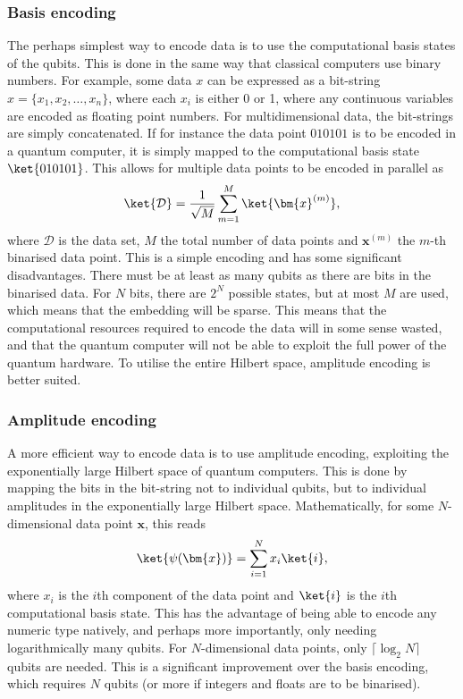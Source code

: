 \subsubsection{Basis encoding}
The perhaps simplest way to encode data is to use the computational basis states of the qubits.
This is done in the same way that classical computers use binary numbers.
For example, some data $x$ can be expressed as a bit-string $x = \{x_1, x_2, \dots, x_n\}$, where each $x_i$ is either 0 or 1, where any continuous variables are encoded as floating point numbers.
For multidimensional data, the bit-strings are simply concatenated.
% 
If for instance the data point $010101$ is to be encoded in a quantum computer, it is simply mapped to the computational basis state $\ket{010101}$.
This allows for multiple data points to be encoded in parallel as
\begin{equation}
  \ket{\mathcal{D}} = \frac{1}{\sqrt M} \sum_{m=1}^M \ket{\bm{x}^{(m)}},
\end{equation}
where $\mathcal{D}$ is the data set, $M$ the total number of data points and $\bm{x}^{(m)}$ the $m$-th binarised data point.
This is a simple encoding and has some significant disadvantages.
There must be at least as many qubits as there are bits in the binarised data.
For $N$ bits, there are $2^N$ possible states, but at most $M$ are used, which means that the embedding will be sparse.
This means that the computational resources required to encode the data will in some sense wasted, and that the quantum computer will not be able to exploit the full power of the quantum hardware.
To utilise the entire Hilbert space, amplitude encoding is better suited.

\subsubsection{Amplitude encoding}
A more efficient way to encode data is to use amplitude encoding, exploiting the exponentially large Hilbert space of quantum computers.
This is done by mapping the bits in the bit-string not to individual qubits, but to individual amplitudes in the exponentially large Hilbert space.
Mathematically, for some $N$-dimensional data point $\bm{x}$, this reads
\begin{equation}
  \ket{\psi(\bm{x})} = \sum_{i=1}^{N} x_i \ket{i},
\end{equation}
where $x_i$ is the $i$th component of the data point and $\ket{i}$ is the $i$th computational basis state.
This has the advantage of being able to encode any numeric type natively, and perhaps more importantly, only needing logarithmically many qubits.
For $N$-dimensional data points, only $\lceil \log_2 N \rceil$ qubits are needed.
This is a significant improvement over the basis encoding, which requires $N$ qubits (or more if integers and floats are to be binarised).

